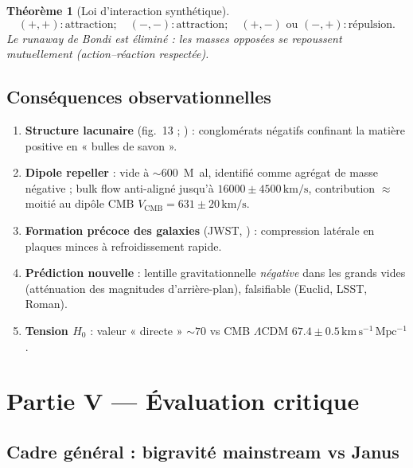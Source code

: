 \documentclass[11pt,a4paper]{article}
\theoremstyle{definition}
\theoremstyle{plain}
\newtheorem{theoreme}{Théorème}[section]
\begin{document}
\begin{theoreme}[Loi d'interaction synthétique]
\begin{equation*}
(+,+):\text{attraction};\quad(-,-):\text{attraction};\quad(+,-)\text{ ou }(-,+):\text{répulsion}.
\end{equation*}
Le runaway de Bondi est éliminé : les masses opposées se repoussent mutuellement
(action--réaction respectée).
\end{theoreme}

\subsection{Conséquences observationnelles}

\begin{enumerate}[leftmargin=1.6em]
\item \textbf{Structure lacunaire} (fig.~13 ; \cite{Petit1995}) : conglomérats négatifs
confinant la matière positive en « bulles de savon ».
\item \textbf{Dipole repeller} \cite{Hoffman2017} : vide à $\sim$600~M~al, identifié comme
agrégat de masse négative ; bulk flow anti-aligné jusqu'à $16000\pm4500\,\mathrm{km/s}$,
contribution $\approx$ moitié au dipôle CMB $V_{\mathrm{CMB}}=631\pm20\,\mathrm{km/s}$.
\item \textbf{Formation précoce des galaxies} (JWST, \cite{Ferreira2022}) : compression latérale
en plaques minces à refroidissement rapide.
\item \textbf{Prédiction nouvelle} : lentille gravitationnelle \emph{négative} dans les grands
vides (atténuation des magnitudes d'arrière-plan), falsifiable (Euclid, LSST, Roman).
\item \textbf{Tension $H_0$} : valeur « directe » $\sim70$ vs CMB $\Lambda$CDM
$67.4\pm0.5\,\mathrm{km\,s^{-1}\,Mpc^{-1}}$ \cite{Planck2020}.
\end{enumerate}

\section{Partie V — Évaluation critique}
\label{part:critique}

\subsection{Cadre général : bigravité mainstream vs Janus}
\end{document}
